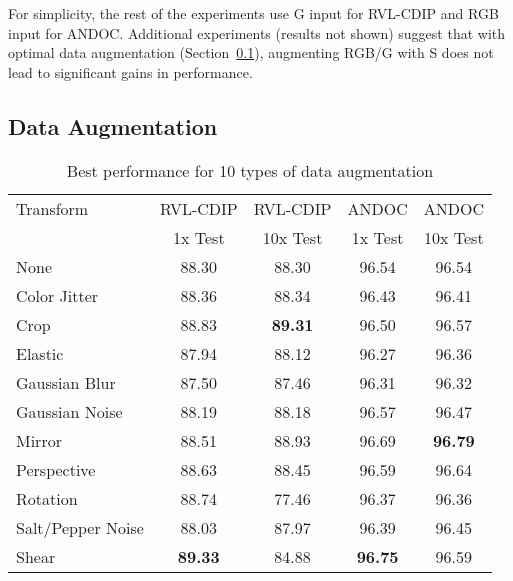\documentclass[10pt, conference, compsocconf]{IEEEtran}
\newcommand{\squeezeup}{\vspace{-2.5mm}}
\begin{document}
For simplicity, the rest of the experiments use G input for RVL-CDIP and RGB input for ANDOC.
Additional experiments (results not shown) suggest that with optimal data augmentation (Section~\ref{sec:data_aug}), augmenting RGB/G with S does not lead to significant gains in performance.


\subsection{Data Augmentation}
\label{sec:data_aug}

\begin{table}

\begin{tabular}{l|c|c|c|c}

Transform                           & RVL-CDIP & RVL-CDIP & ANDOC   & ANDOC    \\
                                    & 1x Test  & 10x Test & 1x Test & 10x Test \\
\hline
None                                & 88.30    & 88.30    & 96.54   & 96.54    \\
Color Jitter                        & 88.36    & 88.34    & 96.43   & 96.41    \\
Crop                                & 88.83    & \textbf{89.31}    & 96.50   & 96.57    \\
Elastic~\cite{simard03}             & 87.94    & 88.12    & 96.27   & 96.36    \\
Gaussian Blur                       & 87.50    & 87.46    & 96.31   & 96.32    \\
Gaussian Noise                      & 88.19    & 88.18    & 96.57   & 96.47    \\
Mirror                              & 88.51    & 88.93    & 96.69   & \textbf{96.79}    \\
Perspective                         & 88.63    & 88.45    & 96.59   & 96.64    \\
Rotation                            & 88.74    & 77.46    & 96.37   & 96.36    \\
Salt/Pepper Noise                   & 88.03    & 87.97    & 96.39   & 96.45    \\
Shear                               & \textbf{89.33} & 84.88    & \textbf{96.75}   & 96.59    \\

\end{tabular}

\caption{Best performance for 10 types of data augmentation}
\squeezeup
\squeezeup
\label{tab:aug}
\end{table}
\end{document}
